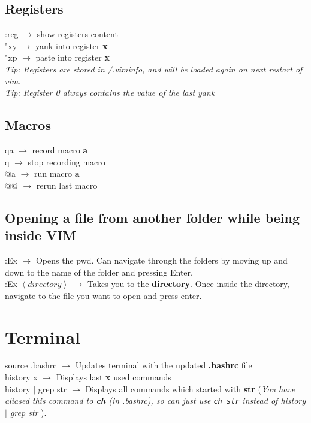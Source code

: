 \documentclass[twoside,a4paper]{article}
\newcommand{\tcb}{\color{blue}}
\newcommand{\tcc}{\color{cyan}}
\newcommand{\tcr}{\color{red}}
\newcommand{\tcg}{\color{gray}}
\newcommand{\tck}{\color{black}}
\newcommand{\ra }{$\rightarrow$ }
\newcommand{\hs}{\hspace}
\begin{document}
\begin{multicols}{2}
    \tcc \subsection{Registers}

    \tcr :reg \tck \ra show registers
    content\\
    \tcr "xy \tck \ra yank into register
    \textbf{x}\\
    \tcr "xp \tck \ra paste into register
    \textbf{x}\\

    \tcg \textit{Tip: Registers are stored in /.viminfo,
        and will be loaded again on next restart of vim.}\\
    \textit{Tip: Register 0 always contains the value of the last
        yank}

    \tcc \subsection{Macros}

    \tcr qa \tck \ra record macro
    \textbf{a}\\
    \tcr q \tck \ra stop recording macro\\
    \tcr @a \tck \ra run macro \textbf{a}\\
    \tcr @@ \tck \ra rerun last macro

    \tcc \subsection{Opening a file from another folder while being
        inside VIM}
    \tcr :Ex \tck \ra Opens the pwd. Can
    navigate through the folders by moving up and down to the name
    of the folder and pressing Enter.\\
    \tcr :Ex \color{ blue} $\left< directory \right>$
    \tck \ra Takes you to the \textbf{directory}.
    Once inside the directory, navigate to the file you want to
    open and press enter.
    \newpage
    \tcc \section{Terminal}
    \hs{-0.5 cm}\tcr  source \tcb  .bashrc \tck
    \ra Updates terminal with the updated \textbf{.bashrc} file\\
    \tcr history \tcb  x \tck \ra Displays
    last \textbf{x} used commands\\
    \tcr history \tcb  $\vert$ grep str \tck
    \ra Displays all commands which started with \textbf{str}
    (\tcg  \textit{You have aliased this command to \textbf{ch}
        (in .bashrc), so can just use \texttt{ch str} instead of history
        $\vert$ grep str} ).\\


\end{multicols}
\end{document}
